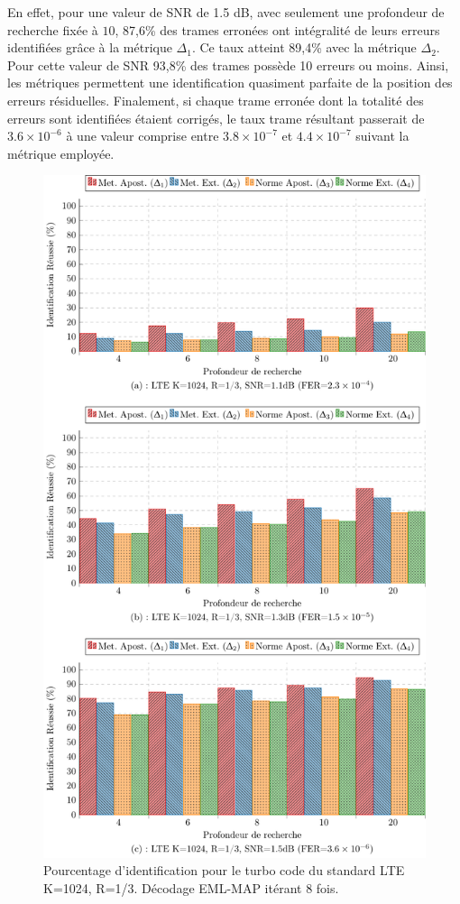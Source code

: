 En effet, pour une valeur de SNR de 1.5 dB, avec seulement une profondeur de recherche fixée à $10$, 87,6\% des 
trames erronées ont intégralité de leurs erreurs identifiées grâce à la métrique $\Delta_1$. Ce taux atteint 89,4\% avec 
la métrique $\Delta_2$. Pour cette valeur de SNR 93,8\% des trames possède 10 erreurs ou moins. Ainsi, les métriques 
permettent une identification quasiment parfaite de la position des erreurs résiduelles. Finalement, si chaque trame 
erronée dont la totalité des erreurs sont identifiées étaient corrigés, le taux trame résultant passerait de 
$3.6\times 10^{-6}$ à une valeur comprise entre $3.8\times 10^{-7}$ et $4.4\times 10^{-7}$ suivant la métrique employée.

\begin{figure}[!htb]
	\centering
	\includegraphics[width=.75\textwidth]{main/ch3_fig/id2/tikz/1024.pdf}
	\caption{Pourcentage d'identification pour le turbo code du standard LTE K=1024, R=1/3.
	Décodage EML-MAP itérant 8 fois. \label{fig:id1024}}
		\vspace*{-1cm}
\end{figure}
